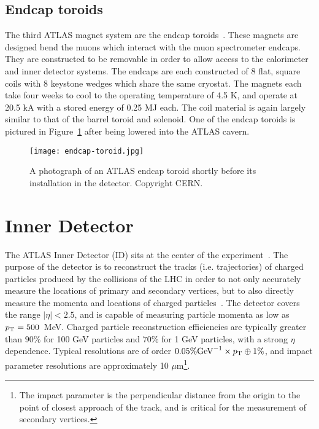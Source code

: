 
\subsection{Endcap toroids}

The third ATLAS magnet system are the endcap toroids~\cite{ATLASPaper}. These magnets are designed bend the muons which interact with the muon spectrometer endcaps. They are constructed to be removable in order to allow access to the calorimeter and inner detector systems. The endcaps are each constructed of 8 flat, square coils with 8 keystone wedges which share the same cryostat. The magnets each take four weeks to cool to the operating temperature of 4.5 K, and operate at 20.5 kA with a stored energy of 0.25 MJ each. The coil material is again largely similar to that of the barrel toroid and solenoid. One of the endcap toroids is pictured in Figure~\ref{fig:detector:endcap-toroid} after being lowered into the ATLAS cavern.



\begin{figure}
\centering
\texttt{[image: endcap-toroid.jpg]}
\label{fig:detector:endcap-toroid}
\caption{A photograph of an ATLAS endcap toroid shortly before its installation in the detector. Copyright CERN.}
\end{figure}



\section{Inner Detector}

The ATLAS Inner Detector (ID) sits at the center of the experiment~\cite{ATLASPaper}. The purpose of the detector is to reconstruct the tracks (i.e. trajectories) of charged particles produced by the collisions of the LHC in order to not only accurately measure the locations of primary and secondary vertices, but to also directly measure the momenta and locations of charged particles~\cite{ATLASExpected}. The detector covers the range $|\eta| < 2.5$, and is capable of measuring particle momenta as low as $p_{\text{T}} = 500$~MeV. Charged particle reconstruction efficiencies are typically greater than $90\%$ for 100 GeV particles and $70\%$ for 1 GeV particles, with a strong $\eta$ dependence. Typical \pT resolutions are of order $0.05\% \mathrm{GeV}^{-1} \times p_{\text{T}} \oplus 1\%$, and impact parameter resolutions are approximately 10 $\mu$m\footnote{The impact parameter is the perpendicular distance from the origin to the point of closest approach of the track, and is critical for the measurement of secondary vertices.}. 

